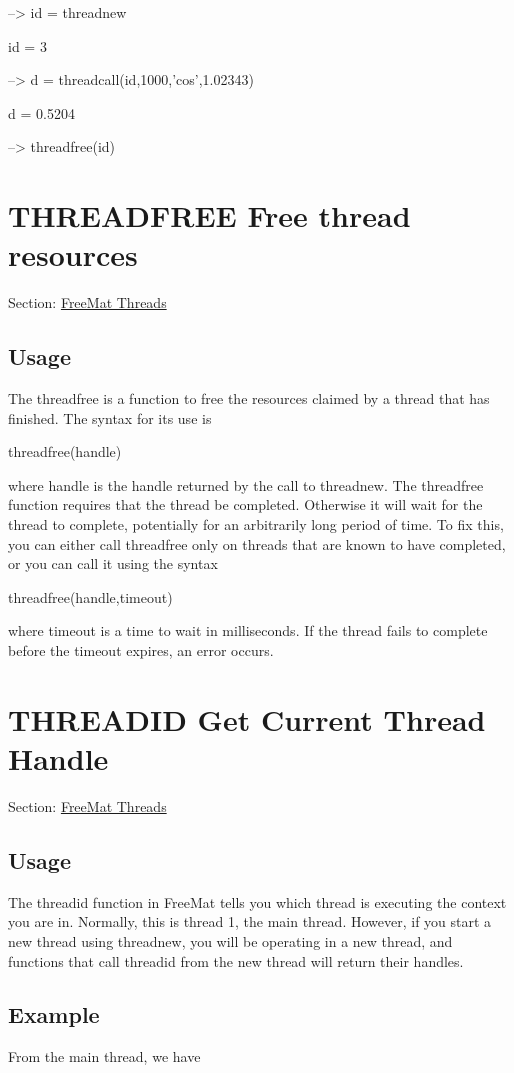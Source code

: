 \begin{DoxyVerbInclude}
--> id = threadnew

id = 
 3 

--> d = threadcall(id,1000,'cos',1.02343)

d = 
    0.5204 

--> threadfree(id)
\end{DoxyVerbInclude}
 \hypertarget{thread_threadfree}{}\section{T\-H\-R\-E\-A\-D\-F\-R\-E\-E Free thread resources}\label{thread_threadfree}
Section\-: \hyperlink{sec_thread}{Free\-Mat Threads} \hypertarget{vtkwidgets_vtkxyplotwidget_Usage}{}\subsection{Usage}\label{vtkwidgets_vtkxyplotwidget_Usage}
The {\ttfamily threadfree} is a function to free the resources claimed by a thread that has finished. The syntax for its use is \begin{DoxyVerb}   threadfree(handle)
\end{DoxyVerb}
 where {\ttfamily handle} is the handle returned by the call to {\ttfamily threadnew}. The {\ttfamily threadfree} function requires that the thread be completed. Otherwise it will wait for the thread to complete, potentially for an arbitrarily long period of time. To fix this, you can either call {\ttfamily threadfree} only on threads that are known to have completed, or you can call it using the syntax \begin{DoxyVerb}   threadfree(handle,timeout)
\end{DoxyVerb}
 where {\ttfamily timeout} is a time to wait in milliseconds. If the thread fails to complete before the timeout expires, an error occurs. \hypertarget{thread_threadid}{}\section{T\-H\-R\-E\-A\-D\-I\-D Get Current Thread Handle}\label{thread_threadid}
Section\-: \hyperlink{sec_thread}{Free\-Mat Threads} \hypertarget{vtkwidgets_vtkxyplotwidget_Usage}{}\subsection{Usage}\label{vtkwidgets_vtkxyplotwidget_Usage}
The {\ttfamily threadid} function in Free\-Mat tells you which thread is executing the context you are in. Normally, this is thread 1, the main thread. However, if you start a new thread using {\ttfamily threadnew}, you will be operating in a new thread, and functions that call {\ttfamily threadid} from the new thread will return their handles. \hypertarget{variables_struct_Example}{}\subsection{Example}\label{variables_struct_Example}
From the main thread, we have


